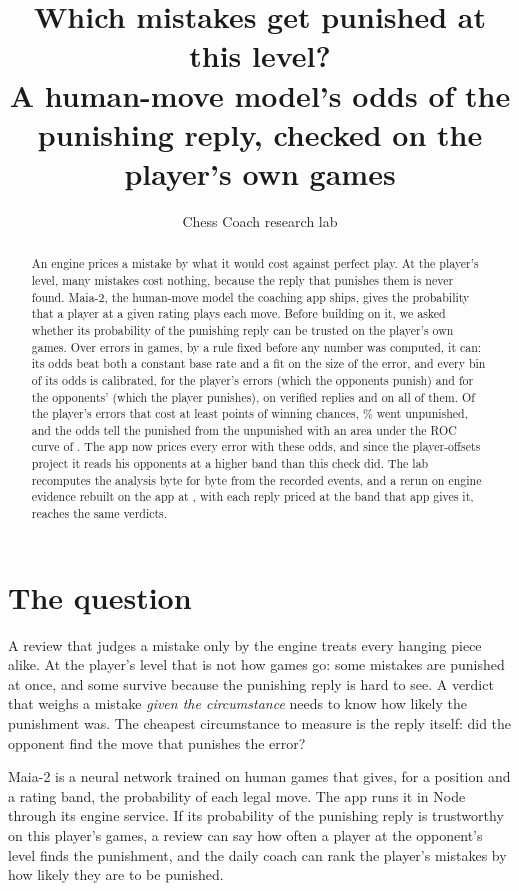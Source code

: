 \documentclass[11pt]{article}
\title{Which mistakes get punished at this level?\\[0.3em]
\large A human-move model's odds of the punishing reply, checked on the player's own games}
\author{Chess Coach research lab}
\date{}
\begin{document}
\maketitle

\begin{abstract}
An engine prices a mistake by what it would cost against perfect play. At the player's level,
many mistakes cost nothing, because the reply that punishes them is never found. Maia-2, the human-move model the coaching app ships, gives the probability that a player
at a given rating plays each move. Before building on it, we asked whether its probability of
the punishing reply can be trusted on the player's own games. Over \Events{} errors in \Games{}
games, by a rule fixed before any number was computed, it can: its odds beat both a constant
base rate and a fit on the size of the error, and every bin of its odds is calibrated, for the
player's errors (which the opponents punish) and for the opponents' (which the player punishes),
on verified replies and on all of them. Of the player's errors that cost at least \StepAt{} points
of winning chances, \PlayerUnpunished\% went unpunished, and the odds tell the punished from the
unpunished with an area under the ROC curve of \PlayerAuc. The app now prices every error with
these odds, and since the player-offsets project it reads his opponents at a higher band than
this check did. The lab recomputes the analysis byte for byte from the recorded events, and a
rerun on engine evidence rebuilt on the app at \AppCommit, with each reply priced at the band
that app gives it, reaches the same verdicts.
\end{abstract}

\section{The question}

A review that judges a mistake only by the engine treats every hanging piece alike. At the
player's level that is not how games go: some mistakes are punished at once, and some survive
because the punishing reply is hard to see. A verdict that weighs a mistake \emph{given the
circumstance} needs to know how likely the punishment was. The cheapest circumstance to measure
is the reply itself: did the opponent find the move that punishes the error?

Maia-2 is a neural network trained on human games that gives, for a position and a rating band,
the probability of each legal move. The app runs it in Node through its engine service. If its
probability of the punishing reply is trustworthy on this player's games, a review can say how
often a player at the opponent's level finds the punishment, and the daily coach can rank the
player's mistakes by how likely they are to be punished.
\end{document}
